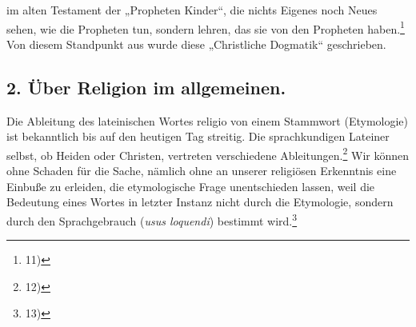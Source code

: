 im alten Testament der „Propheten Kinder“, die nichts Eigenes noch Neues sehen, wie die Propheten tun, sondern lehren, das sie von den Propheten haben.\footnote{11)} Von diesem Standpunkt aus wurde diese „Christliche Dogmatik“ geschrieben.

\subsection*{2. Über Religion im allgemeinen.}

Die Ableitung des lateinischen Wortes religio von einem Stammwort (Etymologie) ist bekanntlich bis auf den heutigen Tag streitig. Die sprachkundigen Lateiner selbst, ob Heiden oder Christen, vertreten verschiedene Ableitungen.\footnote{12)} Wir können ohne Schaden für die Sache, nämlich ohne an unserer religiösen Erkenntnis eine Einbuße zu erleiden, die etymologische Frage unentschieden lassen, weil die Bedeutung eines Wortes in letzter Instanz nicht durch die Etymologie, sondern durch den Sprachgebrauch (\emph{usus loquendi}) bestimmt wird.\footnote{13)}

